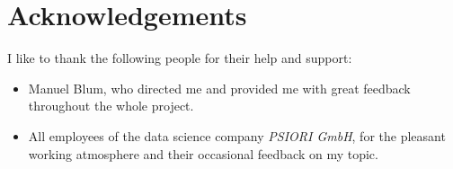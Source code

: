 \section*{Acknowledgements}

I like to thank the following people for their help and support:

\begin{itemize}
\item Manuel Blum, who directed me and provided me with great feedback throughout the whole project.
\item All employees of the data science company \emph{PSIORI GmbH}, for the pleasant working atmosphere and their occasional feedback on my topic.
\end{itemize}

\vspace{3cm}

\clearpage{}